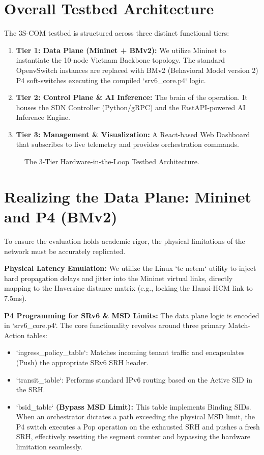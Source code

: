 \section{Overall Testbed Architecture}
The 3S-COM testbed is structured across three distinct functional tiers:
\begin{enumerate}
    \item \textbf{Tier 1: Data Plane (Mininet + BMv2):} We utilize Mininet to instantiate the 10-node Vietnam Backbone topology. The standard OpenvSwitch instances are replaced with BMv2 (Behavioral Model version 2) P4 soft-switches executing the compiled `srv6_core.p4` logic.
    \item \textbf{Tier 2: Control Plane \& AI Inference:} The brain of the operation. It houses the SDN Controller (Python/gRPC) and the FastAPI-powered AI Inference Engine.
    \item \textbf{Tier 3: Management \& Visualization:} A React-based Web Dashboard that subscribes to live telemetry and provides orchestration commands.
\end{enumerate}

\begin{figure}[H]
    \centering
    \vspace{6cm}
    \caption{The 3-Tier Hardware-in-the-Loop Testbed Architecture.}
    \label{fig:testbed_arch}
\end{figure}

\section{Realizing the Data Plane: Mininet and P4 (BMv2)}
To ensure the evaluation holds academic rigor, the physical limitations of the network must be accurately replicated. 

\textbf{Physical Latency Emulation:} We utilize the Linux `tc netem` utility to inject hard propagation delays and jitter into the Mininet virtual links, directly mapping to the Haversine distance matrix (e.g., locking the Hanoi-HCM link to $7.5$ms).

\textbf{P4 Programming for SRv6 \& MSD Limits:} The data plane logic is encoded in `srv6_core.p4`. The core functionality revolves around three primary Match-Action tables:
\begin{itemize}
    \item `ingress_policy_table`: Matches incoming tenant traffic and encapsulates (Push) the appropriate SRv6 SRH header.
    \item `transit_table`: Performs standard IPv6 routing based on the Active SID in the SRH.
    \item `bsid_table` \textbf{(Bypass MSD Limit):} This table implements Binding SIDs. When an orchestrator dictates a path exceeding the physical MSD limit, the P4 switch executes a Pop operation on the exhausted SRH and pushes a fresh SRH, effectively resetting the segment counter and bypassing the hardware limitation seamlessly.
\end{itemize}

